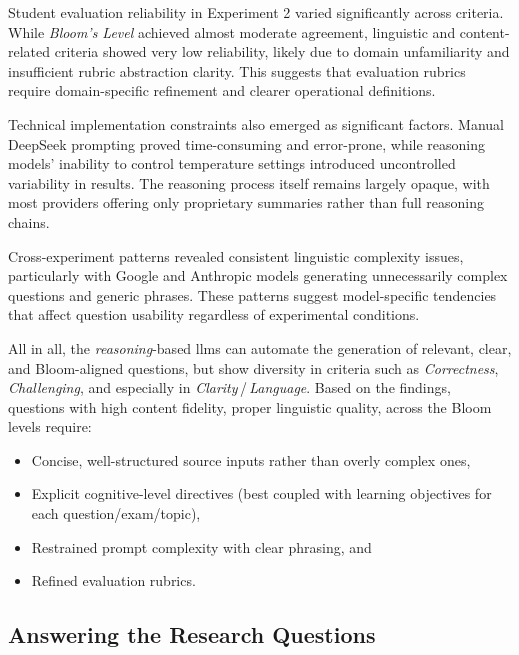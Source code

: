 Student evaluation reliability in Experiment 2 varied significantly across criteria. While \textit{Bloom's Level} achieved almost moderate agreement, linguistic and content-related criteria showed very low reliability, likely due to domain unfamiliarity and insufficient rubric abstraction clarity. This suggests that evaluation rubrics require domain-specific refinement and clearer operational definitions.

Technical implementation constraints also emerged as significant factors. Manual DeepSeek prompting proved time-consuming and error-prone, while reasoning models' inability to control temperature settings introduced uncontrolled variability in results. The reasoning process itself remains largely opaque, with most providers offering only proprietary summaries rather than full reasoning chains.

Cross-experiment patterns revealed consistent linguistic complexity issues, particularly with Google and Anthropic models generating unnecessarily complex questions and generic phrases. These patterns suggest model-specific tendencies that affect question usability regardless of experimental conditions.

All in all, the \textit{reasoning}-based \acp{llm} can automate the generation of relevant, clear, and Bloom-aligned questions, but show diversity in criteria such as \textit{Correctness}, \textit{Challenging}, and especially in \textit{Clarity}\,/\,\textit{Language}. Based on the findings, questions with high content fidelity, proper linguistic quality, across the Bloom levels require:

\begin{itemize}
  \item Concise, well-structured source inputs rather than overly complex ones,
  \item Explicit cognitive-level directives (best coupled with learning objectives for each question/exam/topic),
  \item Restrained prompt complexity with clear phrasing, and
  \item Refined evaluation rubrics.
\end{itemize}

\vp

\subsection{Answering the Research Questions}


